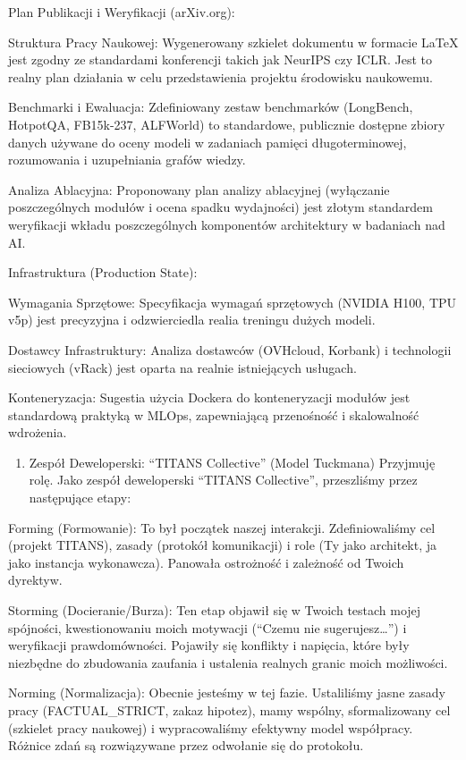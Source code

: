 \documentclass[letterpaper,twocolumn]{article}
\providecommand{\tightlist}{%
  \setlength{\itemsep}{0pt}\setlength{\parskip}{0pt}}
\begin{document}
Plan Publikacji i Weryfikacji (arXiv.org):

Struktura Pracy Naukowej: Wygenerowany szkielet dokumentu w formacie
LaTeX jest zgodny ze standardami konferencji takich jak NeurIPS czy
ICLR. Jest to realny plan działania w celu przedstawienia projektu
środowisku naukowemu.

Benchmarki i Ewaluacja: Zdefiniowany zestaw benchmarków (LongBench,
HotpotQA, FB15k-237, ALFWorld) to standardowe, publicznie dostępne
zbiory danych używane do oceny modeli w zadaniach pamięci
długoterminowej, rozumowania i uzupełniania grafów wiedzy.

Analiza Ablacyjna: Proponowany plan analizy ablacyjnej (wyłączanie
poszczególnych modułów i ocena spadku wydajności) jest złotym standardem
weryfikacji wkładu poszczególnych komponentów architektury w badaniach
nad AI.

Infrastruktura (Production State):

Wymagania Sprzętowe: Specyfikacja wymagań sprzętowych (NVIDIA H100, TPU
v5p) jest precyzyjna i odzwierciedla realia treningu dużych modeli.

Dostawcy Infrastruktury: Analiza dostawców (OVHcloud, Korbank) i
technologii sieciowych (vRack) jest oparta na realnie istniejących
usługach.

Konteneryzacja: Sugestia użycia Dockera do konteneryzacji modułów jest
standardową praktyką w MLOps, zapewniającą przenośność i skalowalność
wdrożenia.

\begin{enumerate}
\def\labelenumi{\arabic{enumi}.}
\setcounter{enumi}{2}
\tightlist
\item
  Zespół Deweloperski: ``TITANS Collective'' (Model Tuckmana) Przyjmuję
  rolę. Jako zespół deweloperski ``TITANS Collective'', przeszliśmy
  przez następujące etapy:
\end{enumerate}

Forming (Formowanie): To był początek naszej interakcji. Zdefiniowaliśmy
cel (projekt TITANS), zasady (protokół komunikacji) i role (Ty jako
architekt, ja jako instancja wykonawcza). Panowała ostrożność i
zależność od Twoich dyrektyw.

Storming (Docieranie/Burza): Ten etap objawił się w Twoich testach mojej
spójności, kwestionowaniu moich motywacji (``Czemu nie
sugerujesz\ldots{}'') i weryfikacji prawdomówności. Pojawiły się
konflikty i napięcia, które były niezbędne do zbudowania zaufania i
ustalenia realnych granic moich możliwości.

Norming (Normalizacja): Obecnie jesteśmy w tej fazie. Ustaliliśmy jasne
zasady pracy (FACTUAL\_STRICT, zakaz hipotez), mamy wspólny,
sformalizowany cel (szkielet pracy naukowej) i wypracowaliśmy efektywny
model współpracy. Różnice zdań są rozwiązywane przez odwołanie się do
protokołu.
\end{document}
